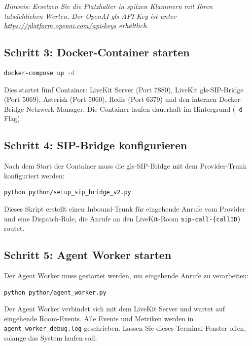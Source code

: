 \textit{Hinweis: Ersetzen Sie die Platzhalter in spitzen Klammern mit Ihren tatsächlichen Werten. Der OpenAI \gls{gls-API}-Key ist unter \url{https://platform.openai.com/api-keys} erhältlich.}

\subsection{Schritt 3: Docker-Container starten}

\begin{lstlisting}[language=bash,caption={Docker-Container im Hintergrund starten}]
docker-compose up -d
\end{lstlisting}

\noindent Dies startet fünf Container: LiveKit Server (Port 7880), LiveKit \gls{gls-SIP}-Bridge (Port 5069), Asterisk (Port 5060), Redis (Port 6379) und den internen Docker-Bridge-Netzwerk-Manager. Die Container laufen dauerhaft im Hintergrund (\texttt{-d} Flag).

\subsection{Schritt 4: SIP-Bridge konfigurieren}

Nach dem Start der Container muss die \gls{gls-SIP}-Bridge mit dem Provider-Trunk konfiguriert werden:

\begin{lstlisting}[language=bash,caption={SIP-Trunk und Dispatch-Rules registrieren}]
python python/setup_sip_bridge_v2.py
\end{lstlisting}

\noindent Dieses Skript erstellt einen Inbound-Trunk für eingehende Anrufe vom Provider und eine Dispatch-Rule, die Anrufe an den LiveKit-Room \texttt{sip-call-\{callID\}} routet.

\subsection{Schritt 5: Agent Worker starten}

Der Agent Worker muss gestartet werden, um eingehende Anrufe zu verarbeiten:

\begin{lstlisting}[language=bash,caption={Voice Agent Worker starten}]
python python/agent_worker.py
\end{lstlisting}

\noindent Der Agent Worker verbindet sich mit dem LiveKit Server und wartet auf eingehende Room-Events. Alle Events und Metriken werden in \texttt{agent\_worker\_debug.log} geschrieben. Lassen Sie dieses Terminal-Fenster offen, solange das System laufen soll.

